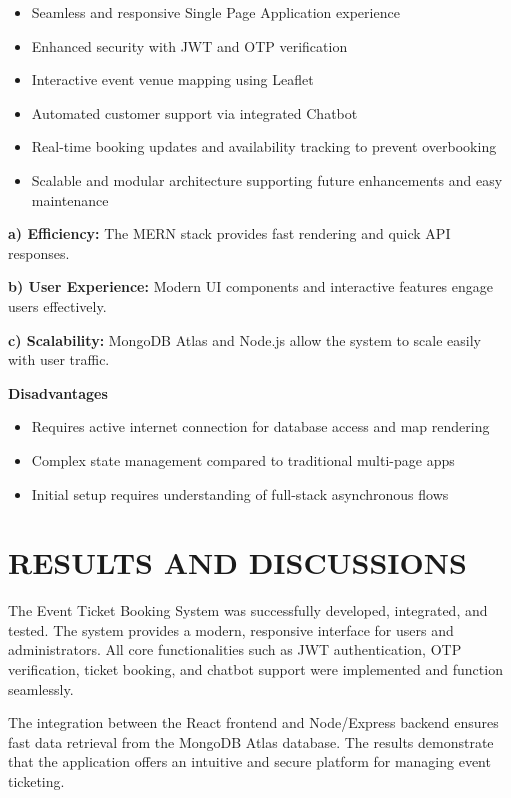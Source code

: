 \documentclass[12pt]{report}
\begin{document}
\begin{itemize}
\item Seamless and responsive Single Page Application experience
\item Enhanced security with JWT and OTP verification
\item Interactive event venue mapping using Leaflet
\item Automated customer support via integrated Chatbot
\item Real-time booking updates and availability tracking to prevent overbooking
\item Scalable and modular architecture supporting future enhancements and easy maintenance
\end{itemize}

\textbf{a) Efficiency:} The MERN stack provides fast rendering and quick API responses.

\textbf{b) User Experience:} Modern UI components and interactive features engage users effectively.

\textbf{c) Scalability:} MongoDB Atlas and Node.js allow the system to scale easily with user traffic.

\textbf{Disadvantages}  

\begin{itemize}
\item Requires active internet connection for database access and map rendering
\item Complex state management compared to traditional multi-page apps
\item Initial setup requires understanding of full-stack asynchronous flows
\end{itemize}

\chapter{RESULTS AND DISCUSSIONS} 
\linespread{1.5} 

The Event Ticket Booking System was successfully developed, integrated, and tested. The system provides a modern, responsive interface for users and administrators. All core functionalities such as JWT authentication, OTP verification, ticket booking, and chatbot support were implemented and function seamlessly.

The integration between the React frontend and Node/Express backend ensures fast data retrieval from the MongoDB Atlas database. The results demonstrate that the application offers an intuitive and secure platform for managing event ticketing.
\end{document}
